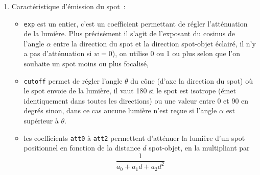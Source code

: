 \documentclass[a4paper,11pt]{article}
\begin{document}
\begin{enumerate}
\item
Caract\'eristique d'\'emission du spot~: 
\begin{itemize}
\item \verb|exp| est un entier, c'est un coefficient permettant de r\'egler
l'att\'enuation de la lumi\`ere. Plus pr\'ecis\'ement il s'agit de
l'exposant du cosinus de l'angle $\alpha$ entre la direction du spot
et la direction spot-objet \'eclair\'e, 
il n'y a pas d'att\'enuation si $w=0$), on utilise 0 ou 1 ou plus selon
que l'on souhaite un spot moins ou plus focalis\'e, 
\item \verb|cutoff| permet de r\'egler l'angle $\theta$ du c\^one (d'axe
la direction du spot) o\`u le spot
envoie de la lumi\`ere, il vaut 180 si le spot est isotrope 
(\'emet identiquement dans toutes les directions) 
ou une valeur entre 0 et 90 en degr\'es sinon, dans ce cas aucune
lumi\`ere n'est re\c{c}ue si l'angle $\alpha$ est sup\'erieur \`a $\theta$.
\item les coefficients \verb|att0| \`a \verb|att2| permettent d'att\'enuer
la lumi\`ere d'un spot positionnel
en fonction de la distance $d$ spot-objet, en la multipliant par
\[ \frac{1}{a_0+a_1 d +a_2 d^2} \]
\end{itemize}
\end{enumerate}
\end{document}
